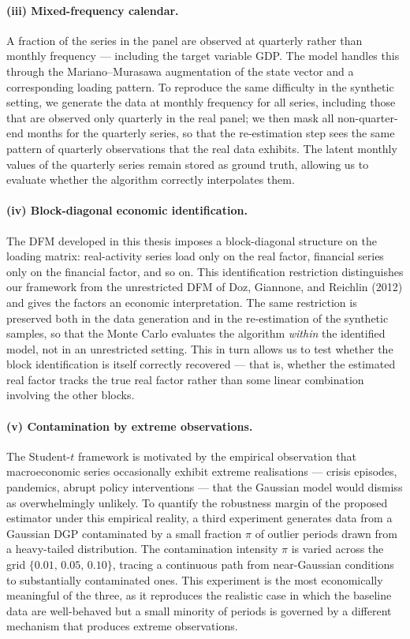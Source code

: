 \documentclass[11pt, a4paper, oneside]{article}
\begin{document}
\paragraph{(iii) Mixed-frequency calendar.}
A fraction of the series in the panel are observed at quarterly
rather than monthly frequency — including the target variable GDP.
The model handles this through the Mariano--Murasawa augmentation
of the state vector and a corresponding loading pattern. To
reproduce the same difficulty in the synthetic setting, we generate
the data at monthly frequency for all series, including those that
are observed only quarterly in the real panel; we then mask all
non-quarter-end months for the quarterly series, so that the
re-estimation step sees the same pattern of quarterly observations
that the real data exhibits. The latent monthly values of the
quarterly series remain stored as ground truth, allowing us to
evaluate whether the algorithm correctly interpolates them.

\paragraph{(iv) Block-diagonal economic identification.}
The DFM developed in this thesis imposes a block-diagonal structure
on the loading matrix: real-activity series load only on the real
factor, financial series only on the financial factor, and so on.
This identification restriction distinguishes our framework from
the unrestricted DFM of Doz, Giannone, and Reichlin (2012) and
gives the factors an economic interpretation. The same restriction
is preserved both in the data generation and in the re-estimation
of the synthetic samples, so that the Monte Carlo evaluates the
algorithm \emph{within} the identified model, not in an
unrestricted setting. This in turn allows us to test whether the
block identification is itself correctly recovered — that is,
whether the estimated real factor tracks the true real factor
rather than some linear combination involving the other blocks.

\paragraph{(v) Contamination by extreme observations.}
The Student-$t$ framework is motivated by the empirical observation
that macroeconomic series occasionally exhibit extreme realisations
— crisis episodes, pandemics, abrupt policy interventions — that
the Gaussian model would dismiss as overwhelmingly unlikely. To
quantify the robustness margin of the proposed estimator under this
empirical reality, a third experiment generates data from a
Gaussian DGP contaminated by a small fraction $\pi$ of outlier
periods drawn from a heavy-tailed distribution. The contamination
intensity $\pi$ is varied across the grid
$\{0.01,\, 0.05,\, 0.10\}$, tracing a continuous path from
near-Gaussian conditions to substantially contaminated ones. This
experiment is the most economically meaningful of the three, as it
reproduces the realistic case in which the baseline data are
well-behaved but a small minority of periods is governed by a
different mechanism that produces extreme observations.
\end{document}
